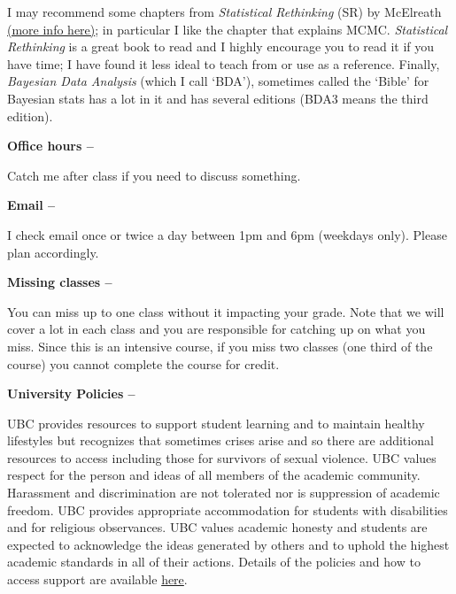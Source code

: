 \documentclass[11pt]{article}
\begin{document}
\noindent I may recommend some chapters from \emph{Statistical Rethinking} (SR) by McElreath \href{http://xcelab.net/rm/statistical-rethinking/}{(more info here)}; in particular I like the chapter that explains MCMC. \emph{Statistical Rethinking} is a great book to read and I highly encourage you to read it if you have time; I have found it less ideal to teach from or use as a reference. Finally, \emph{Bayesian Data Analysis} (which I call `BDA'), sometimes called the `Bible' for Bayesian stats has a lot in it and has several editions (BDA3 means the third edition).  \\ %

\begin{large} 
{\raggedright \textbf{Office hours --}}
\end{large}
Catch me after class if you need to discuss something.\\

\begin{large} 
{\raggedright \textbf{Email --}}
\end{large}
I check email once or twice a day between 1pm and 6pm (weekdays only). Please plan accordingly.\\

\begin{large} 
{\raggedright \textbf{Missing classes --}}
\end{large}
You can miss up to one class without it impacting your grade. Note that we will cover a lot in each class and you are responsible for catching up on what you miss. Since this is an intensive course, if you miss two classes (one third of the course) you cannot complete the course for credit. \\

\begin{large} 
{\raggedright \textbf{University Policies --}}
\end{large}
UBC provides resources to support student learning and to maintain healthy lifestyles but recognizes that sometimes crises arise and so there are additional resources to access including those for survivors of sexual violence. UBC values respect for the person and ideas of all members of the academic community. Harassment and discrimination are not tolerated nor is suppression of academic freedom. UBC provides appropriate accommodation for students with disabilities and for religious observances. UBC values academic honesty and students are expected to acknowledge the ideas generated by others and to uphold the highest academic standards in all of their actions. Details of the policies and how to access support are available \href {https://senate.ubc.ca/vancouver/policies-resources-support-student-success/}{here}.\\
\end{document}
